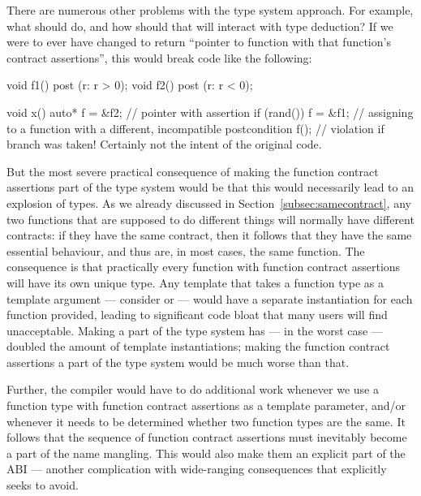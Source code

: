 There are numerous other problems with the type system approach. For example, what should  do, and how should that will interact with type deduction? If we were to ever have  changed to return ``pointer to function with that function's contract assertions'', this would break code like the following:
\begin{codeblock}
void f1() post (r: r > 0);
void f2() post (r: r < 0);

void x() {
  auto* f = &f2;   // pointer with assertion 
  if (rand()) {
    f = &f1;  // assigning to a function with a different, incompatible postcondition
  }
  f();  // violation if branch was taken! Certainly not the intent of the original code.
}
\end{codeblock}
But the most severe practical consequence of making the function contract assertions part of the type system would be that this would necessarily lead to an explosion of types. As we already discussed in Section~\ref{subsec:samecontract}, any two functions that are supposed to do different things will normally have different contracts: if they have the same contract, then it follows that they have the same essential behaviour, and thus are, in most cases, the same function. The consequence is that practically every function with function contract assertions will have its own unique type. Any template that takes a function type as a template argument --- consider  or  --- would have a separate instantiation for each function provided, leading to significant code bloat that many users will find unacceptable. Making  a part of the type system has --- in the worst case --- doubled the amount of template instantiations; making the function contract assertions a part of the type system would be much worse than that.

Further, the compiler would have to do additional work whenever we use a function type with function contract assertions as a template parameter, and/or whenever it needs to be determined whether two function types are the same. It follows that the sequence of function contract assertions must inevitably become a part of the name mangling. This would also make them an explicit part of the ABI --- another complication with wide-ranging consequences that \cite{P2900R7} explicitly seeks to avoid.

